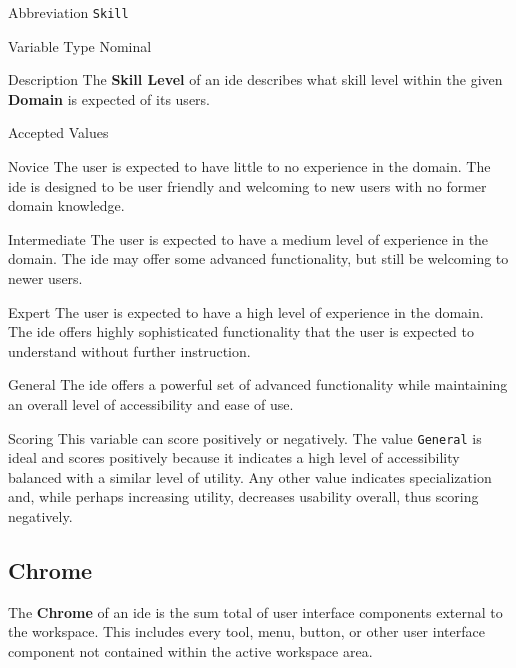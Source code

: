 \begin{AlignedDesc}
  \item[Abbreviation] \texttt{Skill}

  \item[Variable Type] Nominal

  \item[Description] The \textbf{Skill Level} of an \ac{ide} describes what
  skill level within the given \textbf{Domain} is expected of its users.

  \item[Accepted Values]

  \begin{AlignedDesc}
    \item[Novice] The user is expected to have little to no experience in
    the domain. The \ac{ide} is designed to be user friendly and welcoming
    to new users with no former domain knowledge.
    \item[Intermediate] The user is expected to have a medium level of
    experience in the domain. The \ac{ide} may offer some advanced
    functionality, but still be welcoming to newer users.
    \item[Expert] The user is expected to have a high level of experience
    in the domain. The \ac{ide} offers highly sophisticated functionality
    that the user is expected to understand without further instruction.
    \item[General] The \ac{ide} offers a powerful set of advanced
    functionality while maintaining an overall level of accessibility and
    ease of use.
  \end{AlignedDesc}

  \item[Scoring] This variable can score positively or negatively. The
  value \texttt{General} is ideal and scores positively because it
  indicates a high level of accessibility balanced with a similar level of
  utility. Any other value indicates specialization and, while perhaps
  increasing utility, decreases usability overall, thus scoring negatively.

\end{AlignedDesc}


\subsection{Chrome}
\label{subsec:chrome}

The \textbf{Chrome} of an \ac{ide} is the sum total of user interface
components external to the workspace. This includes every tool, menu,
button, or other user interface component not contained within the active
workspace area.

